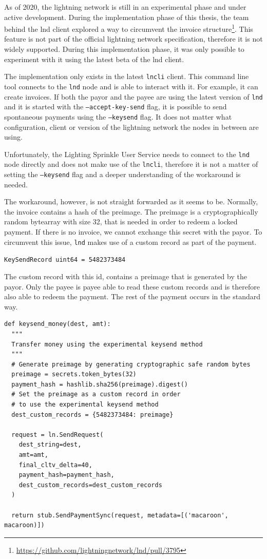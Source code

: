 As of 2020, the lightning network is still in an experimental phase and under active development. During the implementation phase of this thesis, the team behind the lnd client explored a way to circumvent the invoice structure\footnote{\url{https://github.com/lightningnetwork/lnd/pull/3795}}. This feature is not part of the official lightning network specification, therefore it is not widely supported. During this implementation phase, it was only possible to experiment with it using the latest beta of the lnd client. 

The implementation only exists in the latest \texttt{lncli} client. This command line tool connects to the \texttt{lnd} node and is able to interact with it. For example, it can create invoices. If both the payor and the payee are using the latest version of \texttt{lnd} and it is started with the \texttt{--accept-key-send} flag, it is possible to send spontaneous payments using the \texttt{--keysend} flag. It does not matter what configuration, client or version of the lightning network the nodes in between are using. 

Unfortunately, the Lighting Sprinkle User Service needs to connect to the \texttt{lnd} node directly and does not make use of the \texttt{lncli}, therefore it is not a matter of setting the \texttt{--keysend} flag and a deeper understanding of the workaround is needed.

The workaround, however, is not straight forwarded as it seems to be. Normally, the invoice contains a hash of the preimage. The preimage is a cryptographically random bytearray with size 32, that is needed in order to redeem a locked payment. If there is no invoice, we cannot exchange this secret with the payor. To circumvent this issue, \texttt{lnd} makes use of a custom record as part of the payment.

\texttt{KeySendRecord uint64 = 5482373484}

The custom record with this id, contains a preimage that is generated by the payor. Only the payee is payee able to read these custom records and is therefore also able to redeem the payment. The rest of the payment occurs in the standard way.
\lstset{language=Python}
\lstset{frame=lines}
\lstset{basicstyle=\footnotesize}
\begin{lstlisting}
def keysend_money(dest, amt):
  """ 
  Transfer money using the experimental keysend method
  """
  # Generate preimage by generating cryptographic safe random bytes
  preimage = secrets.token_bytes(32) 
  payment_hash = hashlib.sha256(preimage).digest()
  # Set the preimage as a custom record in order 
  # to use the experimental keysend method
  dest_custom_records = {5482373484: preimage}

  request = ln.SendRequest(
    dest_string=dest,
    amt=amt,
    final_cltv_delta=40,
    payment_hash=payment_hash,
    dest_custom_records=dest_custom_records
  )
  
  return stub.SendPaymentSync(request, metadata=[('macaroon', macaroon)])

\end{lstlisting}

